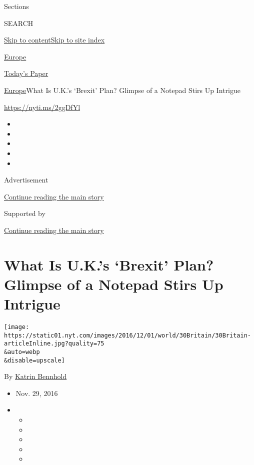 Sections

SEARCH

\protect\hyperlink{site-content}{Skip to
content}\protect\hyperlink{site-index}{Skip to site index}

\href{https://www.nytimes.com/section/world/europe}{Europe}

\href{https://myaccount.nytimes.com/auth/login?response_type=cookie\&client_id=vi}{}

\href{https://www.nytimes.com/section/todayspaper}{Today's Paper}

\href{/section/world/europe}{Europe}\textbar{}What Is U.K.'s `Brexit'
Plan? Glimpse of a Notepad Stirs Up Intrigue

\url{https://nyti.ms/2ggDfYl}

\begin{itemize}
\item
\item
\item
\item
\item
\end{itemize}

Advertisement

\protect\hyperlink{after-top}{Continue reading the main story}

Supported by

\protect\hyperlink{after-sponsor}{Continue reading the main story}

\hypertarget{what-is-uks-brexit-plan-glimpse-of-a-notepad-stirs-up-intrigue}{%
\section{What Is U.K.'s `Brexit' Plan? Glimpse of a Notepad Stirs Up
Intrigue}\label{what-is-uks-brexit-plan-glimpse-of-a-notepad-stirs-up-intrigue}}

\texttt{[image: https://static01.nyt.com/images/2016/12/01/world/30Britain/30Britain-articleInline.jpg?quality=75\\\&auto=webp\\\&disable=upscale]}

By \href{http://www.nytimes.com/by/katrin-bennhold}{Katrin Bennhold}

\begin{itemize}
\item
  Nov. 29, 2016
\item
  \begin{itemize}
  \item
  \item
  \item
  \item
  \item
  \end{itemize}
\end{itemize}

